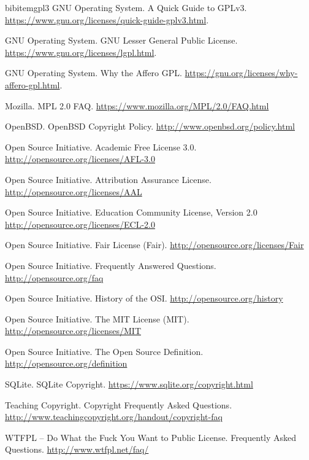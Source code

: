 \documentclass[12pt,letterpaper]{article}
\begin{document}
\begin{thebibliography}{20}
bibitem{gpl3} GNU Operating System. A Quick Guide to GPLv3. \url{https://www.gnu.org/licenses/quick-guide-gplv3.html}.

 GNU Operating System. GNU Lesser General Public License. \url{https://www.gnu.org/licenses/lgpl.html}.

 GNU Operating System. Why the Affero GPL. \url{https://gnu.org/licenses/why-affero-gpl.html}.

 Mozilla. MPL 2.0 FAQ. \url{https://www.mozilla.org/MPL/2.0/FAQ.html}

 OpenBSD. OpenBSD Copyright Policy. \url{http://www.openbsd.org/policy.html}

 Open Source Initiative. Academic Free License 3.0. \url{http://opensource.org/licenses/AFL-3.0}

 Open Source Initiative. Attribution Assurance License. \url{http://opensource.org/licenses/AAL}

 Open Source Initiative. Education Community License, Version 2.0 \url{http://opensource.org/licenses/ECL-2.0}

 Open Source Initiative. Fair License (Fair). \url{http://opensource.org/licenses/Fair}

 Open Source Initiative. Frequently Answered Questions. \url{http://opensource.org/faq}

 Open Source Initiative. History of the OSI. \url{http://opensource.org/history}

 Open Source Initiative. The MIT License (MIT). \url{http://opensource.org/licenses/MIT}

 Open Source Initiative. The Open Source Definition. \url{http://opensource.org/definition}

 SQLite. SQLite Copyright. \url{https://www.sqlite.org/copyright.html}

 Teaching Copyright. Copyright Frequently Asked Questions. \url{http://www.teachingcopyright.org/handout/copyright-faq}

 WTFPL – Do What the Fuck You Want to Public License. Frequently Asked Questions. \url{http://www.wtfpl.net/faq/}

\end{thebibliography}
\end{document}
